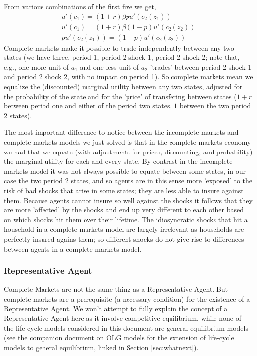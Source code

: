 From various combinations of the first five we get,
\begin{eqnarray*}
 u'(c_1)=(1+r)\beta p u'(c_2(z_1)) \\
 u'(c_1)=(1+r)\beta (1-p) u'(c_2(z_2)) \\
 p u'(c_2(z_1)) = (1-p) u'(c_2(z_2))
\end{eqnarray*}
Complete markets make it possible to trade independently between any two states (we have three, period 1, period 2 shock 1, period 2 shock 2; note that, e.g., one more unit of $a_1$ and one less unit of $a_2$ 'trades' between period 2 shock 1 and period 2 shock 2, with no impact on period 1). So complete markets mean we equalize the (discounted) marginal utility between any two states, adjusted for the probability of the state and for the 'price' of transfering between states ($1+r$ between period one and either of the period two states, $1$ between the two period 2 states).

The most important difference to notice between the incomplete markets and complete markets models we just solved is that in the complete markets economy we had that we equate (with adjustments for prices, discounting, and probability) the marginal utility for each and every state. By contrast in the incomplete markets model it was not always possible to equate between some states, in our case the two period 2 states, and so agents are in this sense more 'exposed' to the risk of bad shocks that arise in some states; they are less able to insure against them. Because agents cannot insure so well against the shocks it follows that they are more 'affected' by the shocks and end up very different to each other based on which shocks hit them over their lifetime. The idiosyncratic shocks that hit a household in a complete markets model are largely irrelevant as households are perfectly insured agains them; so different shocks do not give rise to differences between agents in a complete markets model.

\subsubsection{Representative Agent}
Complete Markets are not the same thing as a Representative Agent. But complete markets are a prerequisite (a necessary condition) for the existence of a Representative Agent. We won't attempt to fully explain the concept of a Representative Agent here as it involve competitive equilibrium, while none of the life-cycle models considered in this document are general equilibrium models (see the companion document on OLG models for the extension of life-cycle models to general equilibrium, linked in Section \ref{sec:whatnext}).


